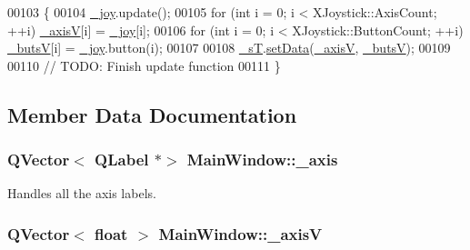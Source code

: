 \begin{DoxyCode}
00103 \{
00104     \hyperlink{class_main_window_a671f35800890e518713e1946671d8730}{\_joy}.update();
00105     \textcolor{keywordflow}{for} (\textcolor{keywordtype}{int} i = 0; i < XJoystick::AxisCount; ++i) \hyperlink{class_main_window_a20f66f574ed4c96d8dfc0013e1095f15}{\_axisV}[i] = \hyperlink{class_main_window_a671f35800890e518713e1946671d8730}{\_joy}[i];
00106     \textcolor{keywordflow}{for} (\textcolor{keywordtype}{int} i = 0; i < XJoystick::ButtonCount; ++i) \hyperlink{class_main_window_a519ae4630572cb63fbd04bce12fe8e77}{\_butsV}[i] = \hyperlink{class_main_window_a671f35800890e518713e1946671d8730}{\_joy}.button(i);
00107     
00108     \hyperlink{class_main_window_a97f8ecc7ecb930b796178cef7b975013}{\_sT}.\hyperlink{class_servo_thread_a8497ea56991b620981ce1fbf53d9ebdb}{setData}(\hyperlink{class_main_window_a20f66f574ed4c96d8dfc0013e1095f15}{\_axisV}, \hyperlink{class_main_window_a519ae4630572cb63fbd04bce12fe8e77}{\_butsV});
00109     
00110     \textcolor{comment}{// TODO: Finish update function}
00111 \}
\end{DoxyCode}


\subsection{Member Data Documentation}
\hypertarget{class_main_window_a30c99d7a544f74b0650758e5cc7ead5a}{}
\subsubsection[{\+\_\+axis}]{\setlength{\rightskip}{0pt plus 5cm}Q\+Vector$<$ Q\+Label $\ast$$>$ Main\+Window\+::\+\_\+axis\hspace{0.3cm}{\ttfamily [private]}}\label{class_main_window_a30c99d7a544f74b0650758e5cc7ead5a}


Handles all the axis labels. 

\hypertarget{class_main_window_a20f66f574ed4c96d8dfc0013e1095f15}{}
\subsubsection[{\+\_\+axis\+V}]{\setlength{\rightskip}{0pt plus 5cm}Q\+Vector$<$ float $>$ Main\+Window\+::\+\_\+axis\+V\hspace{0.3cm}{\ttfamily [private]}}\label{class_main_window_a20f66f574ed4c96d8dfc0013e1095f15}



